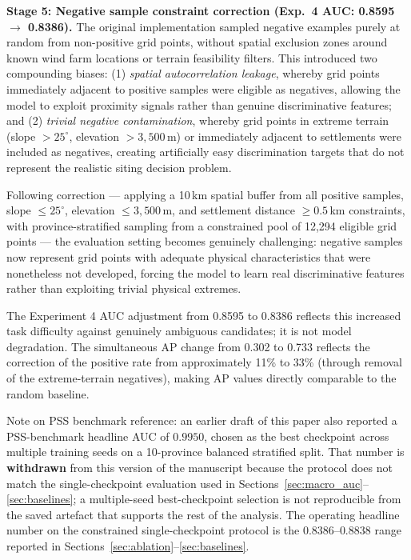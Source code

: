 \documentclass[12pt, a4paper]{article}
\begin{document}
\textbf{Stage 5: Negative sample constraint correction
(Exp.\ 4 AUC: 0.8595 $\rightarrow$ 0.8386).}
The original implementation sampled negative examples purely
at random from non-positive grid points, without spatial
exclusion zones around known wind farm locations or terrain
feasibility filters. This introduced two compounding biases:
(1) \textit{spatial autocorrelation leakage}, whereby grid
points immediately adjacent to positive samples were eligible
as negatives, allowing the model to exploit proximity signals
rather than genuine discriminative features; and (2)
\textit{trivial negative contamination}, whereby grid points
in extreme terrain (slope $> 25^\circ$, elevation $> 3{,}500$\,m)
or immediately adjacent to settlements were included as
negatives, creating artificially easy discrimination targets
that do not represent the realistic siting decision problem.

Following correction --- applying a 10\,km spatial buffer
from all positive samples, slope $\leq 25^\circ$, elevation
$\leq 3{,}500$\,m, and settlement distance $\geq 0.5$\,km
constraints, with province-stratified sampling from a
constrained pool of 12,294 eligible grid points --- the
evaluation setting becomes genuinely challenging: negative
samples now represent grid points with adequate physical
characteristics that were nonetheless not developed, forcing
the model to learn real discriminative features rather than
exploiting trivial physical extremes.

The Experiment 4 AUC adjustment from 0.8595 to 0.8386
reflects this increased task difficulty against genuinely
ambiguous candidates; it is not model degradation. The
simultaneous AP change from 0.302 to 0.733 reflects the
correction of the positive rate from approximately 11\% to
33\% (through removal of the extreme-terrain negatives),
making AP values directly comparable to the random baseline.

Note on PSS benchmark reference: an earlier draft of this
paper also reported a PSS-benchmark headline AUC of $0.9950$,
chosen as the best checkpoint across multiple training seeds
on a 10-province balanced stratified split. That number is
\textbf{withdrawn} from this version of the manuscript because
the protocol does not match the single-checkpoint evaluation
used in Sections~\ref{sec:macro_auc}--\ref{sec:baselines}; a
multiple-seed best-checkpoint selection is not reproducible
from the saved artefact that supports the rest of the
analysis. The operating headline number on the constrained
single-checkpoint protocol is the $0.8386$--$0.8838$ range
reported in Sections~\ref{sec:ablation}--\ref{sec:baselines}.
\end{document}

